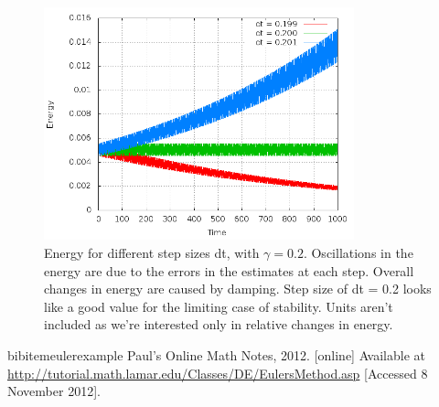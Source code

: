 \documentclass[a4paper,11pt,twoside]{article}
\begin{document}
\begin{figure}[htb]
	\centering
	\includegraphics[width=0.8\textwidth]{euler_energies.png}
	\caption{Energy for different step sizes dt, with \(\gamma = 0.2\). 
		Oscillations in the energy are due to the errors in 
		the estimates at each step. 
		Overall changes in energy are caused by damping.
		Step size of dt = 0.2 looks like a good value for 
		the limiting case of stability. Units aren't included 
		as we're interested only in relative changes in energy.}
	\label{fig:econd}
\end{figure}

\begin{thebibliography}{20}

bibitem{eulerexample}
Paul's Online Math Notes, 2012. [online] Available at \url{http://tutorial.math.lamar.edu/Classes/DE/EulersMethod.asp}
[Accessed 8 November 2012].

\end{thebibliography}
\end{document}
